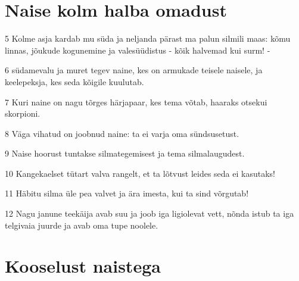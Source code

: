 \section*{Naise kolm halba omadust}

\par 5 Kolme asja kardab mu süda ja neljanda pärast ma palun silmili maas: kõmu linnas, jõukude kogunemine ja valesüüdistus - kõik halvemad kui surm! -
\par 6 südamevalu ja muret tegev naine, kes on armukade teisele naisele, ja keelepeksja, kes seda kõigile kuulutab.
\par 7 Kuri naine on nagu tõrges härjapaar, kes tema võtab, haaraks otsekui skorpioni.
\par 8 Väga vihatud on joobnud naine: ta ei varja oma sündsusetust.
\par 9 Naise hoorust tuntakse silmategemisest ja tema silmalaugudest.
\par 10 Kangekaelset tütart valva rangelt, et ta lõtvust leides seda ei kasutaks!
\par 11 Häbitu silma üle pea valvet ja ära imesta, kui ta sind võrgutab!
\par 12 Nagu janune teekäija avab suu ja joob iga ligiolevat vett, nõnda istub ta iga telgivaia juurde ja avab oma tupe noolele.

\section*{Kooselust naistega}

